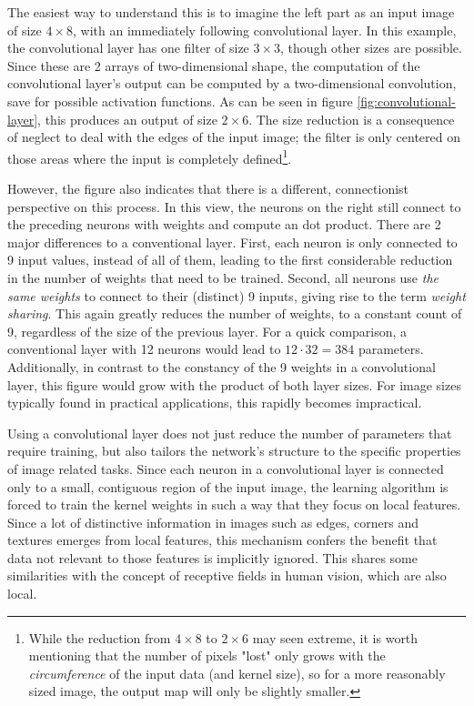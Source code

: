 \documentclass[11pt, a4paper]{article}
\begin{document}
The easiest way to understand this is to imagine the left part as an input image of size $4 \times 8$, with an immediately following convolutional layer. In this example, the convolutional layer has one filter of size $3 \times 3$, though other sizes are possible. Since these are 2 arrays of two-dimensional shape, the computation of the convolutional layer's output can be computed by a two-dimensional convolution, save for possible activation functions. As can be seen in figure \ref{fig:convolutional-layer}, this produces an output of size $2 \times 6$. The size reduction is a consequence of neglect to deal with the edges of the input image; the filter is only centered on those areas where the input is completely defined\footnote{While the reduction from $4 \times 8$ to $2 \times 6$ may seen extreme, it is worth mentioning that the number of pixels "lost" only grows with the \emph{circumference} of the input data (and kernel size), so for a more reasonably sized image, the output map will only be slightly smaller.}.

However, the figure also indicates that there is a different, connectionist perspective on this process. In this view, the neurons on the right still connect to the preceding neurons with weights and compute an dot product. There are 2 major differences to a conventional layer. First, each neuron is only connected to 9 input values, instead of all of them, leading to the first considerable reduction in the number of weights that need to be trained. Second, all neurons use \emph{the same weights} to connect to their (distinct) 9 inputs, giving rise to the term \emph{weight sharing}. This again greatly reduces the number of weights, to a constant count of 9, regardless of the size of the previous layer. For a quick comparison, a conventional layer with 12 neurons would lead to $12 \cdot 32 = 384$ parameters. Additionally, in contrast to the constancy of the 9 weights in a convolutional layer, this figure would grow with the product of both layer sizes. For image sizes typically found in practical applications, this rapidly becomes impractical.

Using a convolutional layer does not just reduce the number of parameters that require training, but also tailors the network's structure to the specific properties of image related tasks. Since each neuron in a convolutional layer is connected only to a small, contiguous region of the input image, the learning algorithm is forced to train the kernel weights in such a way that they focus on local features. Since a lot of distinctive information in images such as edges, corners and textures emerges from local features, this mechanism confers the benefit that data not relevant to those features is implicitly ignored. This shares some similarities with the concept of receptive fields in human vision, which are also local.
\end{document}
